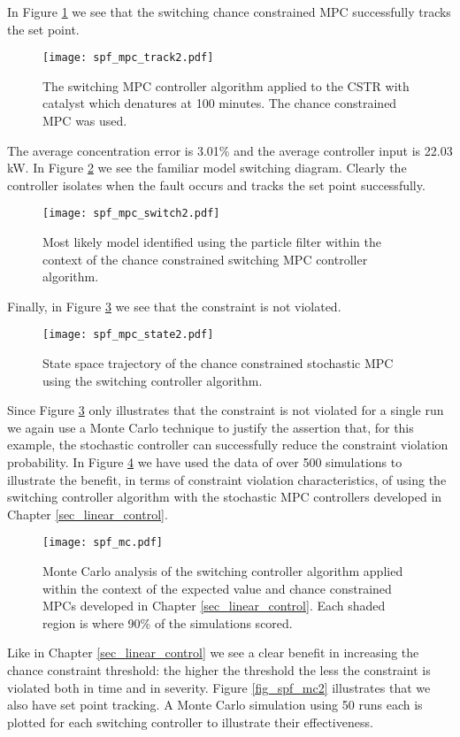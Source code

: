 In Figure \ref{fig_spf_mpc_track2} we see that the switching chance constrained MPC successfully tracks the set point.
\begin{figure}[H] 
\centering
\texttt{[image: spf\_mpc\_track2.pdf]}
\caption{The switching MPC controller algorithm applied to the CSTR with catalyst which denatures at 100 minutes. The chance constrained MPC was used.}
\label{fig_spf_mpc_track2}
\end{figure}
The average concentration error is 3.01\% and the average controller input is 22.03 kW. In Figure \ref{fig_spf_mpc_switch2} we see the familiar model switching diagram. Clearly the controller isolates when the fault occurs and tracks the set point successfully. 
\begin{figure}[H] 
\centering
\texttt{[image: spf\_mpc\_switch2.pdf]}
\caption{Most likely model identified using the particle filter within the context of the chance constrained switching MPC controller algorithm.}
\label{fig_spf_mpc_switch2}
\end{figure}
Finally, in Figure \ref{fig_spf_mpc_state2} we see that the constraint is not violated.
\begin{figure}[H] 
\centering
\texttt{[image: spf\_mpc\_state2.pdf]}
\caption{State space trajectory of the chance constrained stochastic MPC using the switching controller algorithm.}
\label{fig_spf_mpc_state2}
\end{figure}
Since Figure \ref{fig_spf_mpc_state2} only illustrates that the constraint is not violated for a single run we again use a Monte Carlo technique to justify the assertion that, for this example, the stochastic controller can successfully reduce the constraint violation probability. In Figure \ref{fig_spf_mc} we have used the data of over 500 simulations to illustrate the benefit, in terms of constraint violation characteristics, of using the switching controller algorithm with the stochastic MPC controllers developed in Chapter \ref{sec_linear_control}.
\begin{figure}[H] 
\centering
\texttt{[image: spf\_mc.pdf]}
\caption{Monte Carlo analysis of the switching controller algorithm applied within the context of the expected value and chance constrained MPCs developed in Chapter \ref{sec_linear_control}. Each shaded region is where 90\% of the simulations scored.}
\label{fig_spf_mc}
\end{figure}
Like in Chapter \ref{sec_linear_control} we see a clear benefit in increasing the chance constraint threshold: the higher the threshold the less the constraint is violated both in time and in severity. Figure \ref{fig_spf_mc2} illustrates that we also have set point tracking. A Monte Carlo simulation using 50 runs each is plotted for each switching controller to illustrate their effectiveness.
